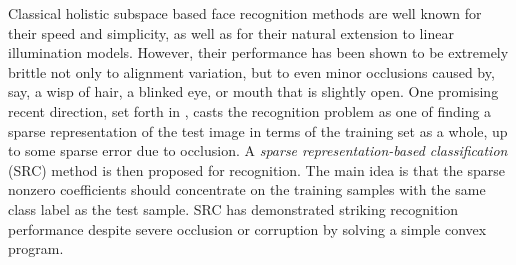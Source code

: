 \documentclass[12pt,journal,draftcls,letterpaper,onecolumn]{IEEEtran}
\begin{document}
Classical holistic subspace based face recognition methods \cite{Turk1991-CVPR,Belhumeur1997-PAMI} are well known for their speed and simplicity, as well as for their natural extension to linear illumination
models.  However, their performance has been shown to be extremely brittle not
only to alignment variation, but to even minor occlusions caused by, say, a
wisp of hair, a blinked eye, or mouth that is slightly open. One promising
recent direction, set forth in \cite{Wright2009-PAMI}, casts the recognition
problem as one of finding a sparse representation of the test image in terms of
the training set as a whole, up to some sparse error due to occlusion. A
\emph{sparse representation-based classification} (SRC) method is then proposed
for recognition. The main idea is that the sparse nonzero coefficients should
concentrate on the training samples with the same class label as the test
sample. SRC has demonstrated striking recognition performance despite severe
occlusion or corruption by solving a simple convex program.  
\end{document}

